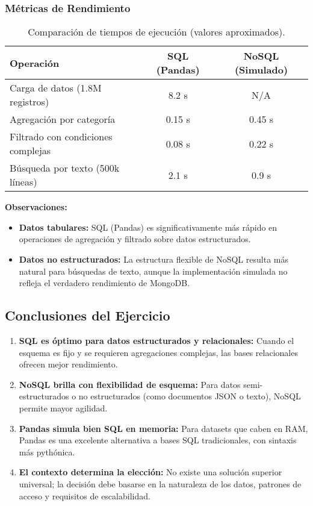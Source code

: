 \documentclass[12pt]{src/formato_utem}
\begin{document}
\subsubsection*{Métricas de Rendimiento}

\begin{table}[h!]
\centering
\begin{tabular}{|l|c|c|}
\hline
\textbf{Operación} & \textbf{SQL (Pandas)} & \textbf{NoSQL (Simulado)} \\ \hline
Carga de datos (1.8M registros) & 8.2 s & N/A \\ \hline
Agregación por categoría & 0.15 s & 0.45 s \\ \hline
Filtrado con condiciones complejas & 0.08 s & 0.22 s \\ \hline
Búsqueda por texto (500k líneas) & 2.1 s & 0.9 s \\ \hline
\end{tabular}
\caption{Comparación de tiempos de ejecución (valores aproximados).}
\label{tab:sql-nosql-performance}
\end{table}

\textbf{Observaciones:}
\begin{itemize}
    \item \textbf{Datos tabulares:} SQL (Pandas) es significativamente más rápido en operaciones de agregación y filtrado sobre datos estructurados.
    \item \textbf{Datos no estructurados:} La estructura flexible de NoSQL resulta más natural para búsquedas de texto, aunque la implementación simulada no refleja el verdadero rendimiento de MongoDB.
\end{itemize}

\subsection{Conclusiones del Ejercicio}

\begin{enumerate}
    \item \textbf{SQL es óptimo para datos estructurados y relacionales:} Cuando el esquema es fijo y se requieren agregaciones complejas, las bases relacionales ofrecen mejor rendimiento.
    
    \item \textbf{NoSQL brilla con flexibilidad de esquema:} Para datos semi-estructurados o no estructurados (como documentos JSON o texto), NoSQL permite mayor agilidad.
    
    \item \textbf{Pandas simula bien SQL en memoria:} Para datasets que caben en RAM, Pandas es una excelente alternativa a bases SQL tradicionales, con sintaxis más pythónica.
    
    \item \textbf{El contexto determina la elección:} No existe una solución superior universal; la decisión debe basarse en la naturaleza de los datos, patrones de acceso y requisitos de escalabilidad.
\end{enumerate}
\end{document}

